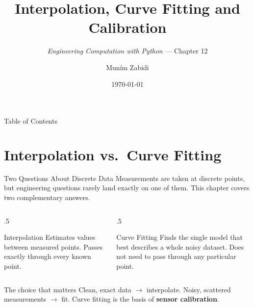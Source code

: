 \documentclass[9pt,aspectratio=169,xcolor=table]{beamer}
\title{Interpolation, Curve Fitting and Calibration}
\subtitle{\emph{Engineering Computation with Python} --- Chapter 12}
\author{Mun\'{i}m Zabidi}
\institute{\color{primary}Faculty of Electrical Engineering, Universiti Teknologi Malaysia}
\date{\today}
\begin{document}
\titlepage

\begin{frame}{Table of Contents}
    \tableofcontents
\end{frame}

\section{Interpolation vs.\ Curve Fitting}

\begin{frame}{Two Questions About Discrete Data}
    \leavevmode
    Measurements are taken at discrete points, but engineering questions
    rarely land exactly on one of them. This chapter covers two
    complementary answers.

    \vspace{3mm}
    \begin{columns}[t]
        \begin{column}{.5\textwidth}
            \begin{block}{Interpolation}
                \small Estimates values \alert{between} measured points.
                Passes exactly through every known point.
            \end{block}
        \end{column}
        \begin{column}{.5\textwidth}
            \begin{block}{Curve Fitting}
                \small Finds the single model that best describes a whole
                \alert{noisy} dataset. Does not need to pass through any
                particular point.
            \end{block}
        \end{column}
    \end{columns}

    \vspace{3mm}
    \begin{alertblock}{The choice that matters}
        Clean, exact data $\to$ interpolate. Noisy, scattered measurements
        $\to$ fit. Curve fitting is the basis of \textbf{sensor
        calibration}.
    \end{alertblock}
\end{frame}
\end{document}

